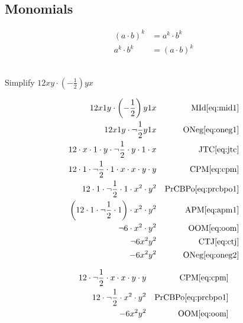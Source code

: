 \subsection*{Monomials}

\begin{arule}
\begin{subequations}
\begin{align}
	(a \cdot b)^k &= a^k \cdot b^k \label{eq:popr1}\\
	a^k \cdot b^k &= (a \cdot b)^k \label{eq:popr2}
\end{align}
\end{subequations}
\end{arule}

\begin{example}[id:20141108-193145] \label{20141108-193145}  \hfill \\

Simplify $12xy \cdot \left(-\frac{1}{2}\right)yx$

\soln

\solnsteps
\begin{align*}
12x1y \cdot \left(-\frac{1}{2}\right)y1x && \text{MId} \eqref{eq:mid1} \\
12x1y \cdot \neg \frac{1}{2}y1x && \text{ONeg} \eqref{eq:oneg1} \\
12 \cdot x \cdot 1 \cdot y \cdot \neg \frac{1}{2} \cdot y \cdot 1 \cdot x  && \text{JTC} \eqref{eq:jtc} \\
12 \cdot 1 \cdot \neg \frac{1}{2} \cdot 1 \cdot x \cdot x \cdot y \cdot y && \text{CPM} \eqref{eq:cpm} \\
12 \cdot 1 \cdot \neg \frac{1}{2} \cdot 1 \cdot x^2 \cdot y^2 && \text{PrCBPo} \eqref{eq:prcbpo1} \\
\left(12 \cdot 1 \cdot \neg \frac{1}{2} \cdot 1  \right) \cdot x^2 \cdot y^2 && \text{APM} \eqref{eq:apm1} \\
\neg 6 \cdot x^2 \cdot y^2 && \text{OOM} \eqref{eq:oom} \\
\neg 6 x^2y^2 && \text{CTJ} \eqref{eq:ctj} \\
-6x^2y^2 && \text{ONeg} \eqref{eq:oneg2}   
\end{align*}

\soln

\lesssteps
\begin{align*}
12 \cdot \neg \frac{1}{2} \cdot x \cdot x \cdot y \cdot y && \text{CPM} \eqref{eq:cpm} \\
12 \cdot \neg \frac{1}{2} \cdot x^2 \cdot y^2 && \text{PrCBPo} \eqref{eq:prcbpo1} \\
-6x^2y^2 && \text{OOM} \eqref{eq:oom}  
\end{align*}

\end{example}

